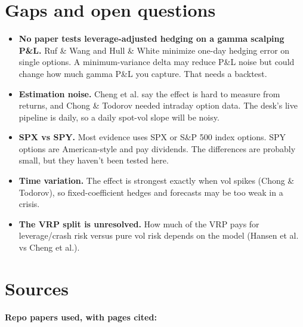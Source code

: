 \documentclass{article}
\begin{document}
\section{Gaps and open questions}

\begin{itemize}

\item \textbf{No paper tests leverage-adjusted hedging on a gamma scalping P\&L.} Ruf \& Wang and Hull \& White minimize one-day hedging error on single options. A minimum-variance delta may reduce P\&L noise but could change how much gamma P\&L you capture. That needs a backtest.

\item \textbf{Estimation noise.} Cheng et al. say the effect is hard to measure from returns, and Chong \& Todorov needed intraday option data. The desk's live pipeline is daily, so a daily spot-vol slope will be noisy.

\item \textbf{SPX vs SPY.} Most evidence uses SPX or S\&P 500 index options. SPY options are American-style and pay dividends. The differences are probably small, but they haven't been tested here.

\item \textbf{Time variation.} The effect is strongest exactly when vol spikes (Chong \& Todorov), so fixed-coefficient hedges and forecasts may be too weak in a crisis.

\item \textbf{The VRP split is unresolved.} How much of the VRP pays for leverage/\allowbreak{}crash risk versus pure vol risk depends on the model (Hansen et al. vs Cheng et al.).

\end{itemize}

\section{Sources}

\textbf{Repo papers used, with pages cited:}
\end{document}
